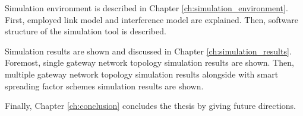 Simulation environment is described in Chapter \ref{ch:simulation_environment}. First, employed link model and interference model are explained. Then, software structure of the simulation tool is described.

Simulation results are shown and discussed in Chapter \ref{ch:simulation_results}. Foremost, single gateway network topology simulation results are shown. Then, multiple gateway network topology simulation results alongside with smart spreading factor schemes simulation results are shown. 

Finally, Chapter \ref{ch:conclusion} concludes the thesis by giving future directions.
